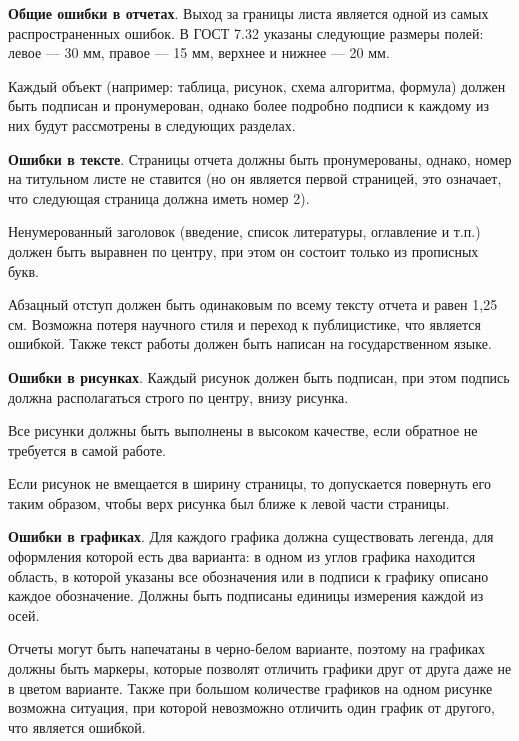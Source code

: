 
\textbf{Общие ошибки в отчетах}. Выход за границы листа является одной из самых распространенных ошибок. В ГОСТ 7.32 указаны следующие размеры полей: левое — 30 мм, правое — 15 мм, верхнее и нижнее — 20 мм. 

Каждый объект (например: таблица, рисунок, схема алгоритма, формула) должен быть подписан и пронумерован, однако более подробно подписи к каждому из них будут рассмотрены в следующих разделах.

\textbf{Ошибки в тексте}. Страницы отчета должны быть пронумерованы, однако, номер на титульном листе не ставится (но он является первой страницей, это означает, что следующая страница должна иметь номер 2).

Ненумерованный заголовок (введение, список литературы, оглавление и т.п.) должен быть выравнен по центру, при этом он состоит только из прописных букв.

Абзацный отступ должен быть одинаковым по всему тексту отчета и равен 1,25 см. Возможна потеря научного стиля и переход к публицистике, что является ошибкой. Также текст работы должен быть написан на государственном языке.

\textbf{Ошибки в рисунках}. Каждый рисунок должен быть подписан, при этом подпись должна располагаться строго по центру, внизу рисунка.

Все рисунки должны быть выполнены в высоком качестве, если обратное не требуется в самой работе.

Если рисунок не вмещается в ширину страницы, то допускается повернуть его таким образом, чтобы верх рисунка был ближе к левой части страницы.

\textbf{Ошибки в графиках}. Для каждого графика должна существовать легенда, для оформления которой есть два варианта: в одном из углов графика находится область, в которой указаны все обозначения или в подписи к графику описано каждое обозначение. Должны быть подписаны единицы измерения каждой из осей.

Отчеты могут быть напечатаны в черно-белом варианте, поэтому на графиках должны быть маркеры, которые позволят отличить графики друг от друга даже не в цветом варианте. Также при большом количестве графиков на одном рисунке возможна ситуация, при которой невозможно отличить один график от другого, что является ошибкой.

